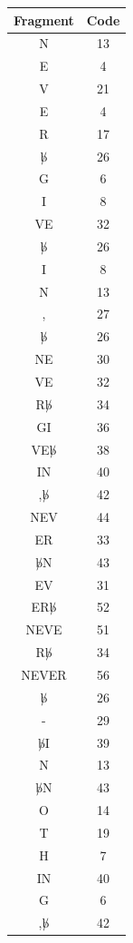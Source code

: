 \documentclass{article}[12pt]
\begin{document}
\begin{tabular}{|c|c|}
  \hline
  Fragment & Code \\
  \hline
  N & 13 \\
  E & 4 \\
  V & 21 \\
  E & 4 \\
  R & 17 \\
  $\not b$ & 26 \\
  G & 6 \\
  I & 8 \\
  VE & 32 \\
  $\not b$ & 26 \\
  I & 8 \\
  N & 13 \\
  , & 27 \\
  $\not b$ & 26 \\
  NE & 30 \\
  VE & 32 \\
  R$\not b$ & 34 \\
  GI & 36 \\
  VE$\not b$ & 38 \\
  IN & 40 \\
  ,$\not b$ & 42 \\
  NEV & 44 \\
  ER & 33 \\
  $\not b$N & 43 \\
  EV & 31 \\
  ER$\not b$ & 52 \\
  NEVE & 51 \\
  R$\not b$ & 34 \\
  NEVER & 56 \\
  $\not b$ & 26 \\
  - & 29 \\
  $\not b$I & 39 \\
  N & 13 \\
  $\not b$N & 43 \\
  O & 14 \\
  T & 19 \\
  H & 7 \\
  IN & 40 \\
  G & 6 \\
  ,$\not b$ & 42 \\
  \hline
\end{tabular}
\end{document}
